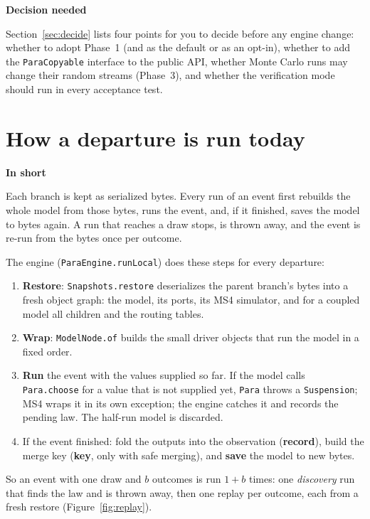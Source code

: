 \documentclass[11pt]{article}
\newcommand{\code}[1]{\texttt{#1}}
\newcommand{\shadedbox}[3]{\par\smallskip\noindent\colorbox{#1}{\parbox{\dimexpr\linewidth-2\fboxsep}{\textbf{#2}\par #3}}\par\smallskip}
\newcommand{\takeaway}[1]{\shadedbox{okbg}{In short}{#1}}
\newcommand{\decision}[1]{\shadedbox{warnbg}{Decision needed}{#1}}
\begin{document}
\decision{Section~\ref{sec:decide} lists four points for you to decide before any engine change: whether to adopt
Phase~1 (and as the default or as an opt-in), whether to add the \code{ParaCopyable} interface to the public API,
whether Monte Carlo runs may change their random streams (Phase~3), and whether the verification mode should run in
every acceptance test.}

\section{How a departure is run today}\label{sec:today}

\takeaway{Each branch is kept as serialized bytes. Every run of an event first rebuilds the whole model from those
bytes, runs the event, and, if it finished, saves the model to bytes again. A run that reaches a draw stops, is thrown
away, and the event is re-run from the bytes once per outcome.}

The engine (\code{ParaEngine.runLocal}) does these steps for every departure:
\begin{enumerate}
\item \textbf{Restore}: \code{Snapshots.restore} deserializes the parent branch's bytes into a fresh object graph:
  the model, its ports, its MS4 simulator, and for a coupled model all children and the routing tables.
\item \textbf{Wrap}: \code{ModelNode.of} builds the small driver objects that run the model in a fixed order.
\item \textbf{Run} the event with the values supplied so far. If the model calls \code{Para.choose} for a value
  that is not supplied yet, \code{Para} throws a \code{Suspension}; MS4 wraps it in its own exception; the engine
  catches it and records the pending law. The half-run model is discarded.
\item If the event finished: fold the outputs into the observation (\textbf{record}), build the merge key
  (\textbf{key}, only with safe merging), and \textbf{save} the model to new bytes.
\end{enumerate}
So an event with one draw and $b$ outcomes is run $1+b$ times: one \emph{discovery} run that finds the law and is
thrown away, then one replay per outcome, each from a fresh restore (Figure~\ref{fig:replay}).
\end{document}
